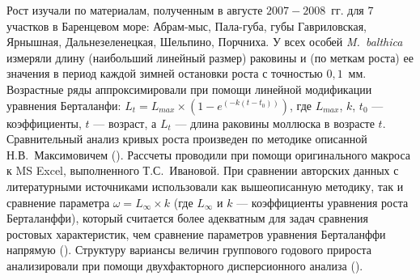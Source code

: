 Рост изучали по материалам, полученным в августе $2007 - 2008$~гг. для $7$ участков в Баренцевом море: Абрам-мыс, Пала-губа, губы Гавриловская, Ярнышная, Дальнезеленецкая, Шельпино, Порчниха.
У всех особей {\it M.~balthica} измеряли длину (наибольший линейный размер) раковины и (по меткам роста) ее значения в период каждой зимней остановки роста с точностью $0,1$~мм.
Возрастные ряды аппроксимировали при помощи линейной модификации уравнения Берталанфи: $L_{t} = L_{max} \times (1 - e^{(-k(t - t_{0}))})$, где $L_{max}$, $k$, $t_{0}$ --- коэффициенты, $t$ --- возраст, а $L_{t}$ --- длина раковины моллюска в возрасте $t$.
Сравнительный анализ кривых роста произведен по методике описанной Н.В.~Максимовичем (\cite*{Maximovich_1989}). 
Рассчеты проводили при помощи оригинального макроса к MS Excel, выполненного Т.С.~Ивановой.
При сравнении авторских данных с литературными источниками использовали как вышеописанную методику, так и сравнение параметра $\omega = L_{\infty} \times k$ (где $L_{\infty}$ и $k$ --- коэффициенты уравнения роста Берталанффи), который считается более адекватным для задач сравнения ростовых характеристик, чем сравнение параметров уравнения Берталанффи напрямую (\cite{Appeldoorn_1983, Beukema_Meehan_1985}). 
Структуру вариансы величин группового годового прироста анализировали при помощи двухфакторного дисперсионного анализа (\cite{Chambers_Hastie_1991}). 

